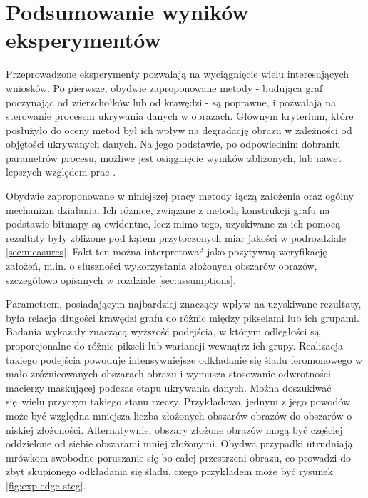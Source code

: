 {    \section{Podsumowanie wyników eksperymentów}
    {
        Przeprowadzone eksperymenty pozwalają na wyciągnięcie wielu interesujących wniosków. Po pierwsze, obydwie
        zaproponowane metody - budująca graf poczynając od wierzchołków lub od krawędzi - są poprawne, i pozwalają na
        sterowanie procesem ukrywania danych w obrazach. Głównym kryterium, które posłużyło do oceny metod był ich wpływ
        na degradację obrazu w zależności od objętości ukrywanych danych. Na jego podstawie, po odpowiednim dobraniu
        parametrów procesu, możliwe jest osiągnięcie wyników zbliżonych, lub nawet lepszych względem prac \cite{Solak2018LSBSA, Muhuri2020ANI, Khan2018AntCO}.

        Obydwie zaproponowane w niniejszej pracy metody łączą założenia oraz ogólny mechanizm działania. Ich różnice,
        związane z metodą konstrukcji grafu na podstawie bitmapy są ewidentne, lecz mimo tego, uzyskiwane za ich pomocą
        rezultaty były zbliżone pod kątem przytoczonych miar jakości w podrozdziale \ref{sec:measures}. Fakt ten można
        interpretować jako pozytywną weryfikację założeń, m.in. o słuszności wykorzystania złożonych obszarów obrazów,
        szczegółowo opisanych w rozdziale \ref{sec:assumptions}.

        Parametrem, posiadającym najbardziej znaczący wpływ na uzyskiwane rezultaty, była relacja długości krawędzi
        grafu do różnic między pikselami lub ich grupami. Badania wykazały znaczącą wyższość podejścia, w którym
        odległości są proporcjonalne do różnic pikseli lub wariancji wewnątrz ich grupy. Realizacja takiego podejścia
        powoduje intensywniejsze odkładanie się śladu feromonowego w mało zróżnicowanych obszarach obrazu i wymusza
        stosowanie odwrotności macierzy maskującej podczas etapu ukrywania danych. Można doszukiwać się wielu przyczyn
        takiego stanu rzeczy. Przykładowo, jednym z jego powodów może być względna mniejsza liczba złożonych obszarów
        obrazów do obszarów o niskiej złożoności. Alternatywnie, obszary złożone obrazów mogą być częściej oddzielone od
        siebie obszarami mniej złożonymi. Obydwa przypadki utrudniają mrówkom swobodne poruszanie się bo całej
        przestrzeni obrazu, co prowadzi do zbyt skupionego odkładania się śladu, czego przykładem może być rysunek
        \ref{fig:exp-edge-steg}.

}}
